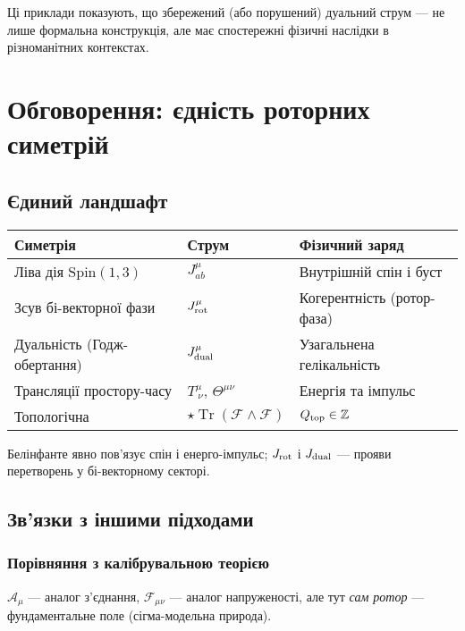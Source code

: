 \documentclass[11pt,a4paper]{article}
\numberwithin{equation}{section}
\theoremstyle{plain}
\theoremstyle{definition}
\theoremstyle{remark}
\DeclareMathOperator{\Tr}{Tr}
\begin{document}
Ці приклади показують, що збережений (або порушений) дуальний струм — не лише формальна конструкція, але має спостережні фізичні наслідки в різноманітних контекстах.

\section{Обговорення: єдність роторних симетрій}
\label{sec:discussion}

\subsection{Єдиний ландшафт}

\begin{center}
\renewcommand{\arraystretch}{1.3}
\begin{tabular}{@{}lll@{}}
\toprule
Симетрія & Струм & Фізичний заряд \\
\midrule
Ліва дія $\mathrm{Spin}(1,3)$ & $J^\mu_{ab}$ & Внутрішній спін і буст \\
Зсув бі-векторної фази & $J^\mu_{\rm rot}$ & Когерентність (ротор-фаза) \\
Дуальність (Годж-обертання) & $J^\mu_{\rm dual}$ & Узагальнена гелікальність \\
Трансляції простору-часу & $T^{\mu}_{\ \nu}$, $\Theta^{\mu\nu}$ & Енергія та імпульс \\
Топологічна & $\star\Tr(\mathcal{F}\wedge\mathcal{F})$ & $Q_{\rm top}\in\mathbb{Z}$ \\
\bottomrule
\end{tabular}
\end{center}

Белінфанте явно пов’язує спін і енерго-імпульс; $J_{\rm rot}$ і $J_{\rm dual}$ — прояви перетворень у бі-векторному секторі.

\subsection{Зв’язки з іншими підходами}

\subsubsection{Порівняння з калібрувальною теорією}

$\mathcal{A}_\mu$ — аналог з’єднання, $\mathcal{F}_{\mu\nu}$ — аналог напруженості, але тут \emph{сам ротор} — фундаментальне поле (сігма-модельна природа).
\end{document}

